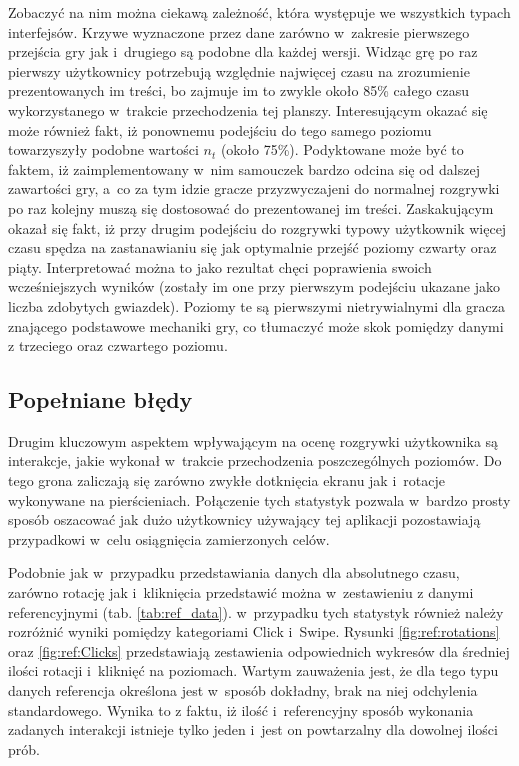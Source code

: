 \documentclass[a4paper,12pt,numbers=noenddot]{report}
\begin{document}
Zobaczyć na nim można ciekawą zależność, która występuje we wszystkich typach interfejsów. Krzywe wyznaczone przez dane zarówno w~zakresie pierwszego przejścia gry jak i~drugiego są podobne dla każdej wersji. Widząc grę po raz pierwszy użytkownicy potrzebują względnie najwięcej czasu na zrozumienie prezentowanych im treści, bo zajmuje im to zwykle około 85\% całego czasu wykorzystanego w~trakcie przechodzenia tej planszy. Interesującym okazać się może również fakt, iż ponownemu podejściu do tego samego poziomu towarzyszyły podobne wartości $n_{t}$ (około 75\%). Podyktowane może być to faktem, iż zaimplementowany w~nim samouczek bardzo odcina się od dalszej zawartości gry, a~co za tym idzie gracze przyzwyczajeni do normalnej rozgrywki po raz kolejny muszą się dostosować do prezentowanej im treści.
Zaskakującym okazał się fakt, iż przy drugim podejściu do rozgrywki typowy użytkownik więcej czasu spędza na zastanawianiu się jak optymalnie przejść poziomy czwarty oraz piąty. Interpretować można to jako rezultat chęci poprawienia swoich wcześniejszych wyników (zostały im one przy pierwszym podejściu ukazane jako liczba zdobytych gwiazdek). Poziomy te są pierwszymi nietrywialnymi dla gracza znającego podstawowe mechaniki gry, co tłumaczyć może skok pomiędzy danymi z trzeciego oraz czwartego poziomu. \\

\subsection{Popełniane błędy}
Drugim kluczowym aspektem wpływającym na ocenę rozgrywki użytkownika są interakcje, jakie wykonał w~trakcie przechodzenia poszczególnych poziomów. Do tego grona zaliczają się zarówno zwykłe dotknięcia ekranu jak i~rotacje wykonywane na pierścieniach. Połączenie tych statystyk pozwala w~bardzo prosty sposób oszacować jak dużo użytkownicy używający tej aplikacji pozostawiają przypadkowi w~celu osiągnięcia zamierzonych celów. 

Podobnie jak w~przypadku przedstawiania danych dla absolutnego czasu, zarówno rotację jak i~kliknięcia przedstawić można w~zestawieniu z danymi referencyjnymi (tab. \ref{tab:ref_data}). w~przypadku tych statystyk również należy rozróżnić wyniki pomiędzy kategoriami Click i~Swipe. Rysunki
\ref{fig:ref:rotations} oraz \ref{fig:ref:Clicks} przedstawiają zestawienia odpowiednich wykresów dla średniej ilości rotacji i~kliknięć na poziomach. Wartym zauważenia jest, że dla tego typu danych referencja określona jest w~sposób dokładny, brak na niej odchylenia standardowego. Wynika to z faktu, iż ilość i~referencyjny sposób wykonania zadanych interakcji istnieje tylko jeden i~jest on powtarzalny dla dowolnej ilości prób.
\end{document}
